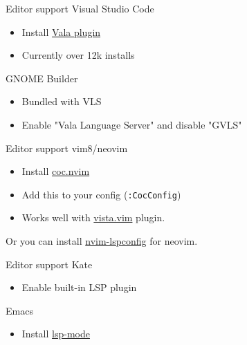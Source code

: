 \documentclass[t]{beamer}
\begin{document}
\begin{frame}[c]{Editor support}
    Visual Studio Code
    \begin{itemize}
        \item Install \href{https://marketplace.visualstudio.com/items?itemName=prince781.vala}{Vala plugin}
        \item Currently over 12k installs
    \end{itemize}
    
    GNOME Builder
    \begin{itemize}
        \item Bundled with VLS
        \item Enable "Vala Language Server" and disable "GVLS"
    \end{itemize}
\end{frame}


\begin{frame}[c]{Editor support}
    vim8/neovim
    \begin{itemize}
        \item Install \href{https://github.com/neoclide/coc.nvim}{coc.nvim}
        \item Add this to your config (\texttt{:CocConfig})
        \item Works well with \href{https://github.com/liuchengxu/vista.vim}{vista.vim} plugin.
    \end{itemize}
    \exampleCode
    
    Or you can install \href{https://github.com/neovim/nvim-lspconfig/blob/f81570d1288fd974098e0f311f728469ca919155/lua/lspconfig/vala\_ls.lua}{nvim-lspconfig} for neovim.
\end{frame}

\begin{frame}[c]{Editor support}
    Kate
    \begin{itemize}
        \item Enable built-in LSP plugin
    \end{itemize}
    
    Emacs
    \begin{itemize}
        \item Install \href{https://emacs-lsp.github.io/lsp-mode/page/lsp-vala/}{lsp-mode}
    \end{itemize}
\end{frame}
\end{document}
